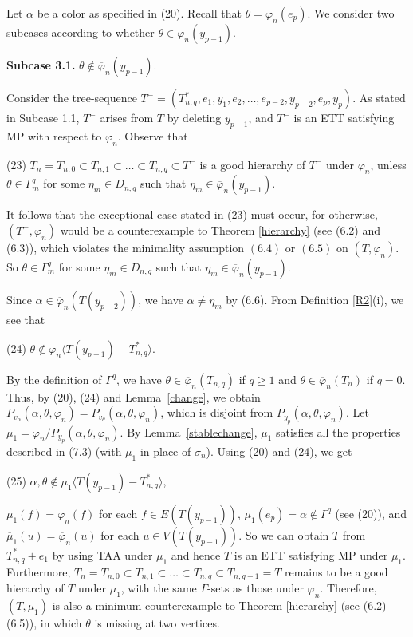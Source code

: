 \documentclass[11pt]{article}
\newcommand{\phibar}{\overline{\varphi}}
\begin{document}
\vskip 3mm

Let $\alpha$ be a color as specified in (20). Recall that $\theta=\varphi_n(e_p)$. We consider 
two subcases according to whether $\theta\in \phibar_n(y_{p-1})$.

{\bf Subcase 3.1.} $\theta \notin\phibar_n(y_{p-1})$.

Consider the tree-sequence $T^-=(T_{n,q}^*, e_1, y_1, e_2, \ldots, e_{p-2}, y_{p-2}, e_p, y_p)$. As stated in 
Subcase 1.1, $T^-$ arises from $T$ by deleting $y_{p-1}$, and $T^-$ is an ETT satisfying MP with respect to $\varphi_n$. 
Observe that 

(23) $T_n=T_{n,0} \subset T_{n,1} \subset \ldots \subset T_{n,q} \subset T^-$ is a good hierarchy 
of $T^-$ under $\varphi_n$, unless $\theta\in \Gamma^{q}_m$ for some $\eta_m\in D_{n,q}$ such that $\eta_m 
\in\phibar_n(y_{p-1})$. 

It follows that the exceptional case stated in (23) must occur, for otherwise, $(T^-, \varphi_n)$ would be a counterexample
to Theorem \ref{hierarchy} (see (6.2) and (6.3)), which violates the minimality assumption $(6.4)$ or $(6.5)$ on 
$(T, \varphi_n)$. So $\theta\in \Gamma^{q}_m$ for some $\eta_m\in D_{n,q}$ such that $\eta_m \in\phibar_n(y_{p-1})$. 

Since $\alpha\in\phibar_n(T(y_{p-2}))$, we have $\alpha\neq \eta_m$ by (6.6). From Definition \ref{R2}(i),
we see that 

(24) $\theta \notin \varphi_n \langle T(y_{p-1}) - T_{n,q}^* \rangle$. 

\noindent By the definition of $\Gamma^q$, we have $\theta \in \overline{\varphi}_n(T_{n,q})$ if $q \ge 1$ and $\theta \in \overline{\varphi}_n(T_n)$ if $q=0$. Thus, by (20), (24) and Lemma~\ref{change}, we obtain $P_{v_{\alpha}} (\alpha, \theta, 
\varphi_n) = P_{v_{\theta}}(\alpha, \theta, \varphi_n)$, which is disjoint from $P_{y_p}(\alpha, \theta, \varphi_n)$. Let $\mu_1=\varphi_n/P_{y_{p}}(\alpha,\theta, \varphi_n)$. By Lemma~\ref{stablechange},  $\mu_1$ satisfies all the 
properties described in (7.3) (with $\mu_1$ in place of $\sigma_n$).  Using (20) and (24), we get 

(25) $\alpha, \theta \notin \mu_1 \langle T(y_{p-1})-T_{n,q}^* \rangle$,  

\noindent $\mu_1(f)=\varphi_n(f)$ for each $f\in E(T(y_{p-1}))$, $\mu_1(e_p)=\alpha \notin \Gamma^q$ (see (20)), 
and $\overline{\mu}_1(u)= \phibar_n(u)$ for each $u\in V(T(y_{p-1}))$. So we can obtain $T$ from $T_{n,q}^*+e_1$ by 
using TAA under $\mu_1$ and hence $T$ is an ETT satisfying MP under $\mu_1$. Furthermore, $T_n=T_{n,0} \subset T_{n,1} \subset 
\ldots \subset T_{n,q} \subset T_{n,q+1}=T$ remains to be a good hierarchy of $T$ under $\mu_1$,
with the same $\Gamma$-sets as those under $\varphi_n$. Therefore, $(T, \mu_1)$ is also a minimum counterexample to Theorem \ref{hierarchy} (see (6.2)-(6.5)), in which $\theta$ is missing at two vertices.
\end{document}
